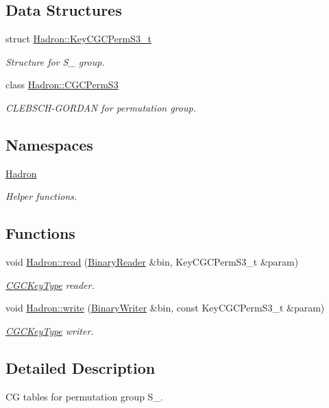 \subsection*{Data Structures}
\begin{DoxyCompactItemize}
\item 
struct \mbox{\hyperlink{structHadron_1_1KeyCGCPermS3__t}{Hadron\+::\+Key\+C\+G\+C\+Perm\+S3\+\_\+t}}
\begin{DoxyCompactList}\small\item\em Structure for S\+\_ group. \end{DoxyCompactList}\item 
class \mbox{\hyperlink{classHadron_1_1CGCPermS3}{Hadron\+::\+C\+G\+C\+Perm\+S3}}
\begin{DoxyCompactList}\small\item\em C\+L\+E\+B\+S\+C\+H-\/\+G\+O\+R\+D\+AN for permutation group. \end{DoxyCompactList}\end{DoxyCompactItemize}
\subsection*{Namespaces}
\begin{DoxyCompactItemize}
\item 
 \mbox{\hyperlink{namespaceHadron}{Hadron}}
\begin{DoxyCompactList}\small\item\em Helper functions. \end{DoxyCompactList}\end{DoxyCompactItemize}
\subsection*{Functions}
\begin{DoxyCompactItemize}
\item 
void \mbox{\hyperlink{namespaceHadron_ad884472dd0b4c3567f37f8320b63dee3}{Hadron\+::read}} (\mbox{\hyperlink{classADATIO_1_1BinaryReader}{Binary\+Reader}} \&bin, Key\+C\+G\+C\+Perm\+S3\+\_\+t \&param)
\begin{DoxyCompactList}\small\item\em \mbox{\hyperlink{structHadron_1_1CGCKeyType}{C\+G\+C\+Key\+Type}} reader. \end{DoxyCompactList}\item 
void \mbox{\hyperlink{namespaceHadron_a4073084eccc97c67b860f51e4efd91e0}{Hadron\+::write}} (\mbox{\hyperlink{classADATIO_1_1BinaryWriter}{Binary\+Writer}} \&bin, const Key\+C\+G\+C\+Perm\+S3\+\_\+t \&param)
\begin{DoxyCompactList}\small\item\em \mbox{\hyperlink{structHadron_1_1CGCKeyType}{C\+G\+C\+Key\+Type}} writer. \end{DoxyCompactList}\end{DoxyCompactItemize}


\subsection{Detailed Description}
CG tables for permutation group S\+\_. 

